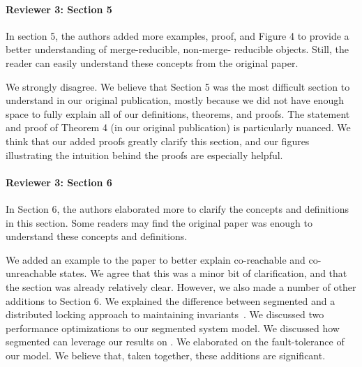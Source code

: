 \documentclass[9pt]{article}
\begin{document}
\begin{multicols*}{2}
\paragraph{Reviewer 3: Section 5}
\begin{feedback}
  In section 5, the authors added more examples, proof, and Figure 4 to provide
  a better understanding of merge-reducible, non-merge- reducible objects.
  Still, the reader can easily understand these concepts from the original
  paper.
\end{feedback}
We strongly disagree. We believe that Section 5 was the most difficult section
to understand in our original publication, mostly because we did not have
enough space to fully explain all of our definitions, theorems, and proofs. The
statement and proof of Theorem 4 (in our original publication) is particularly
nuanced. We think that our added proofs greatly clarify this section, and our
figures illustrating the intuition behind the proofs are especially helpful.

\paragraph{Reviewer 3: Section 6}
\begin{feedback}
  In Section 6, the authors elaborated more to clarify the concepts and
  definitions in this section. Some readers may find the original paper was
  enough to understand these concepts and definitions.
\end{feedback}
We added an example to the paper to better explain co-reachable and
co-unreachable states.  We agree that this was a minor bit of clarification,
and that the section was already relatively clear. However, we also made a
number of other additions to Section 6. We explained the difference between
segmented \invariantconfluence{} and a distributed locking approach to
maintaining invariants~\cite{balegas2015putting, gotsman2016cause}. We
discussed two performance optimizations to our segmented \invariantconfluence{}
system model.  We discussed how segmented \invariantconfluence{} can leverage
our results on \mergereducibility{}. We elaborated on the fault-tolerance of
our model. We believe that, taken together, these additions are significant.


\end{multicols*}
\end{document}
